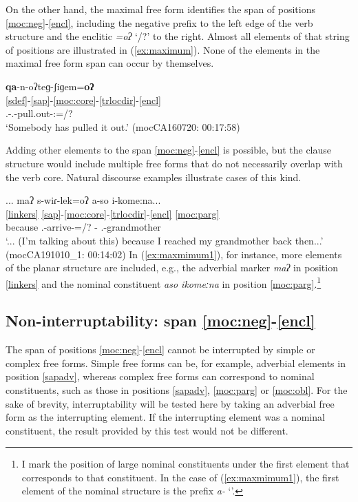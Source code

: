 \documentclass[output=paper]{langscibook}
\begin{document}
On the other hand, the maximal free form identifies the span of positions \ref{moc:neg}-\ref{encl}, including the negative prefix to the left edge of the verb structure and the enclitic \textit{=oʔ} `\Evid/\Tprl?' to the right.  Almost all elements of that string of positions are illustrated in (\ref{ex:maximum}). None of the elements in the maximal free form span can occur by themselves.   

\ea\label{ex:maximum}
\glll  \textbf{qa}-n-oʔteɡ-ʃiɡem=\textbf{oʔ}\\
 \ref{sdef}-\ref{sap}-\ref{moc:core}-\ref{trlocdir}-\ref{encl}\\
 {\Sbj.\Def}-{\Third.\III}-pull.out-{\Dir:\Up}={\Evid/\Tprl}?\\
	\glt `Somebody has pulled it out.'
	 \hfill (mocCA160720: 00:17:58)
\z

Adding other elements to the span \ref{moc:neg}-\ref{encl} is possible, but the clause structure would include multiple free forms that do not necessarily overlap with the verb core. Natural discourse examples illustrate cases of this kind.     

\ea \label{ex:maxmimum1}
	\glll ... maʔ s-wiɾ-lek=oʔ a-so i-kome:na... \\
	       {} \ref{linkers}   \ref{sap}-\ref{moc:core}-\ref{trlocdir}-\ref{encl} \ref{moc:parg}\\ 
	   {} {because} {\First.\II}-arrive-{\LocOne}={\Evid}/{\Tprl}? {\F}-{\DetTwo} {\First\Sg.\Poss}-grandmother \\
	\glt `... (I'm talking about this) because I reached my grandmother back then...'\\
\glt	\hfill (mocCA191010\_1: 00:14:02)
\z
In (\ref{ex:maxmimum1}), for instance, more elements of the planar structure are included, e.g., the adverbial marker \textit{maʔ} in position \ref{linkers} and the nominal constituent \textit{aso ikomeːna} in position \ref{moc:parg}.\footnote{I mark the position of large nominal constituents under the first element that corresponds to that constituent. In the case of (\ref{ex:maxmimum1}), the first element of the nominal structure is the prefix \textit{a-} `\F'.}


\subsection{Non-interruptability: span \ref{moc:neg}-\ref{encl}}
\label{sec:noninter}

The span of positions \ref{moc:neg}-\ref{encl} cannot be interrupted by simple or complex free forms. Simple free forms can be, for example, adverbial elements in position \ref{sapadv}, whereas complex free forms can correspond to nominal constituents, such as those in positions \ref{sapadv}, \ref{moc:parg}  or \ref{moc:obl}. For the sake of brevity, interruptability will be tested here by taking an adverbial free form as the interrupting element. If the interrupting element was a nominal constituent, the result provided by this test would not be different. 
\end{document}
